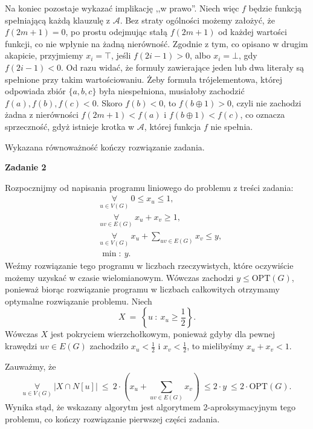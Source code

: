 \documentclass[12pt]{article}
\begin{document}
	\medskip
	
	Na koniec pozostaje wykazać implikację ,,w prawo''. Niech więc \(f\) będzie
	funkcją spełniającą każdą klauzulę z \(\mathcal{A}\). Bez straty ogólności
	możemy założyć, że \(f(2m + 1) = 0\), po prostu odejmując stałą \(f(2m +
	1)\) od każdej wartości funkcji, co nie wpłynie na żadną nierówność. Zgodnie
	z tym, co opisano w drugim akapicie, przyjmiemy \(x_{i} = \top\), jeśli
	\(f(2i - 1) > 0\), albo \(x_{i} = \bot\), gdy \(f(2i - 1) < 0\). Od razu
	widać, że formuły zawierające jeden lub dwa literały są spełnione przy takim
	wartościowaniu. Żeby formuła trójelementowa, której odpowiada zbiór \(\{a,
	b, c\}\) była niespełniona, musiałoby zachodzić \(f(a), f(b), f(c) < 0\).
	Skoro \(f(b) < 0\), to \(f(b \oplus 1) > 0\), czyli nie zachodzi żadna z
	nierówności \(f(2m + 1) < f(a)\) i \(f(b \oplus 1) < f(c)\), co oznacza
	sprzeczność, gdyż istnieje krotka w \(\mathcal{A}\), której funkcja \(f\)
	nie spełnia.
	
	\medskip
	
	Wykazana równoważność kończy rozwiązanie zadania.
	
	\bigskip
	
	\textbf{Zadanie 2}
	
	\medskip
	
	Rozpocznijmy od napisania programu liniowego do problemu z treści zadania:
	\begin{align*}
		&\underset{u \in V(G)}{\forall} \ 0 \leqslant x_{u} \leqslant 1
		\text{,} \\
		&\underset{uv \in E(G)}{\forall} \ x_{u} + x_{v} \geqslant 1 \text{,} \\
		&\underset{u \in V(G)}{\forall} \ x_{u} + \sum\limits_{uv \in E(G)}
		x_{v} \leqslant y \text{,} \\
		&\min\!: \ y \text{.}
	\end{align*}
	Weźmy rozwiązanie tego programu w liczbach rzeczywistych, które oczywiście
	możemy uzyskać w czasie wielomianowym. Wówczas zachodzi \(y \leqslant
	\text{OPT}(G)\), ponieważ biorąc rozwiązanie programu w liczbach całkowitych
	otrzymamy optymalne rozwiązanie problemu. Niech
	\[ X \ = \ \left\{ u \ : \ x_{u} \geqslant \frac{1}{2} \right\} \text{.} \]
	Wówczas \(X\) jest pokryciem wierzchołkowym, ponieważ gdyby dla pewnej
	krawędzi \(uv \in E(G)\) zachodziło \(x_{u} < \frac{1}{2}\) i \(x_{v} <
	\frac{1}{2}\), to mielibyśmy \(x_{u} + x_{v} < 1\).
	
	\medskip
	
	Zauważmy, że
	\[ \underset{u \in V(G)}{\forall} \ |X \cap N[u]| \ \leqslant \ 2 \cdot
	\left( x_{u} + \sum\limits_{uv \in E(G)} x_{v} \right) \ \leqslant 2 \cdot y
	\ \leqslant 2 \cdot \text{OPT}(G) \text{.} \]
	Wynika stąd, że wskazany algorytm jest algorytmem 2-aproksymacyjnym tego
	problemu, co kończy rozwiązanie pierwszej części zadania.
\end{document}
